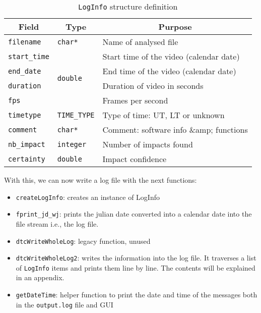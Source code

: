 \documentclass[a4paper,11pt]{memoir}
\begin{document}
\begin{table}[H]
\centering
\caption{\texttt{LogInfo} structure definition}
\label{my-label}
\begin{tabular}{|m{}|m{}|m{}|}
\hline
\multicolumn{1}{|c|}{\textbf{Field}} & \multicolumn{1}{c|}{\textbf{Type}} & \multicolumn{1}{c|}{\textbf{Purpose}} \\ \hline 
\texttt{filename} & \texttt{char*} & Name of analysed file \\ \hline
\texttt{start\_time} & \multirow{4}{*}{\texttt{double}} & Start time of the video (calendar date) \\ \cline{1-1} \cline{3-3}
\texttt{end\_date} & & End time of the video (calendar date)  \\ \cline{1-1} \cline{3-3}
\texttt{duration} & & Duration of video in seconds   \\ \cline{1-1} \cline{3-3}
\texttt{fps} & & Frames per second   \\ \hline
\texttt{timetype} & \texttt{TIME\_TYPE} & Type of time: UT, LT or unknown \\ \hline
\texttt{comment} & \texttt{char*} & Comment: software info \&amp; functions  \\ \hline
\texttt{nb\_impact} & \texttt{integer} & Number of impacts found \\ \hline
\texttt{certainty} & \texttt{double} & Impact confidence \\ \hline
\end{tabular}
\end{table}

With this, we can now write a log file with the next functions:
\begin{itemize}
\item \texttt{createLogInfo}: creates an instance of LogInfo
\item \texttt{fprint\_jd\_wj}: prints the julian date converted into a calendar date into the file
stream i.e., the log file.
\item \texttt{dtcWriteWholeLog}: legacy function, unused
\item \texttt{dtcWriteWholeLog2}: writes the information into the log file. It traverses a list of \texttt{LogInfo} items and prints them line by line. The contents will be explained in an appendix.
\item \texttt{getDateTime}: helper function to print the date and time of the messages both in the \texttt{output.log} file and GUI
\end{itemize}
\end{document}
